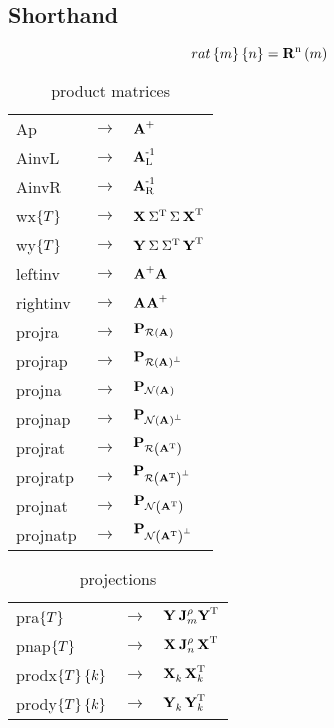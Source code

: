 \subsection{Shorthand}
\begin{equation}
  rat\lst{m}\lst{n} = \rat{m}{n}
\end{equation}

\begin{table}[htdp]
\begin{center}
\begin{tabular}{lcl}
  Ap          & $\to$ & $\Ap$      \\
  AinvL       & $\to$ & $\AinvL$   \\
  AinvR       & $\to$ & $\AinvR$   \\
  wx$\lst{T}$ & $\to$ & $\wx{T}$   \\
  wy$\lst{T}$ & $\to$ & $\wy{T}$   \\
  leftinv     & $\to$ & $\leftinv$ \\
  rightinv    & $\to$ & $\rightinv$\\
  projra      & $\to$ & $\projra$  \\
  projrap     & $\to$ & $\projrap$ \\
  projna      & $\to$ & $\projna$  \\
  projnap     & $\to$ & $\projnap$ \\
  projrat     & $\to$ & $\projrat$ \\
  projratp    & $\to$ & $\projratp$\\
  projnat     & $\to$ & $\projnat$ \\
  projnatp    & $\to$ & $\projnatp$\\
\end{tabular}
\end{center}
\caption{product matrices}
\end{table}%

\begin{table}[htdp]
\begin{center}
\begin{tabular}{lcl}
  pra$\lst{T}$ & $\to$ & $\pra{T}$\\
  pnap$\lst{T}$ & $\to$ & $\pnap{T}$\\
  prodx$\lst{T}\lst{k}$ & $\to$ & $\prodx{T}{k}$\\
  prody$\lst{T}\lst{k}$ & $\to$ & $\prody{T}{k}$\\
\end{tabular}
\end{center}
\caption{projections}
\end{table}%

